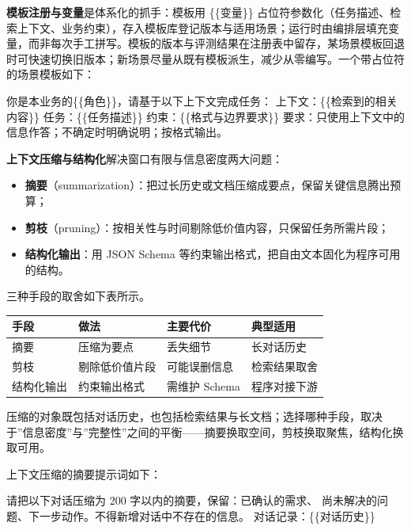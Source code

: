 \documentclass[12pt,a4paper,twoside,openany]{ctexbook}
\numberwithin{figure}{chapter}
\numberwithin{table}{chapter}
\newenvironment{Shaded}{}{}
\newcommand{\NormalTok}[1]{#1}
\providecommand{\tightlist}{\setlength{\itemsep}{0pt}\setlength{\parskip}{0pt}}
\newcounter{none}
\begin{document}
\textbf{模板注册与变量}是体系化的抓手：模板用 \{\{变量\}\}
占位符参数化（任务描述、检索上下文、业务约束），存入模板库登记版本与适用场景；运行时由编排层填充变量，而非每次手工拼写。模板的版本与评测结果在注册表中留存，某场景模板回退时可快速切换旧版本；新场景尽量从既有模板派生，减少从零编写。一个带占位符的场景模板如下：

\begin{Shaded}
\begin{Highlighting}[]
\NormalTok{你是本业务的\{\{角色\}\}，请基于以下上下文完成任务：}
\NormalTok{上下文：\{\{检索到的相关内容\}\}}
\NormalTok{任务：\{\{任务描述\}\}}
\NormalTok{约束：\{\{格式与边界要求\}\}}
\NormalTok{要求：只使用上下文中的信息作答；不确定时明确说明；按格式输出。}
\end{Highlighting}
\end{Shaded}

\textbf{上下文压缩与结构化}解决窗口有限与信息密度两大问题：

\begin{itemize}
\tightlist
\item
  \textbf{摘要}（summarization）：把过长历史或文档压缩成要点，保留关键信息腾出预算；
\item
  \textbf{剪枝}（pruning）：按相关性与时间剔除低价值内容，只保留任务所需片段；
\item
  \textbf{结构化输出}：用 JSON Schema
  等约束输出格式，把自由文本固化为程序可用的结构。
\end{itemize}

三种手段的取舍如下表所示。

{\def\LTcaptype{none} %
\begin{longtable}[]{@{}llll@{}}
\toprule\noalign{}
手段 & 做法 & 主要代价 & 典型适用 \\
\midrule\noalign{}
\endhead
\bottomrule\noalign{}
\endlastfoot
摘要 & 压缩为要点 & 丢失细节 & 长对话历史 \\
剪枝 & 剔除低价值片段 & 可能误删信息 & 检索结果取舍 \\
结构化输出 & 约束输出格式 & 需维护 Schema & 程序对接下游 \\
\end{longtable}
}

压缩的对象既包括对话历史，也包括检索结果与长文档；选择哪种手段，取决于''信息密度''与''完整性''之间的平衡------摘要换取空间，剪枝换取聚焦，结构化换取可用。

上下文压缩的摘要提示词如下：

\begin{Shaded}
\begin{Highlighting}[]
\NormalTok{请把以下对话压缩为 200 字以内的摘要，保留：已确认的需求、}
\NormalTok{尚未解决的问题、下一步动作。不得新增对话中不存在的信息。}
\NormalTok{对话记录：\{\{对话历史\}\}}
\end{Highlighting}
\end{Shaded}
\end{document}
